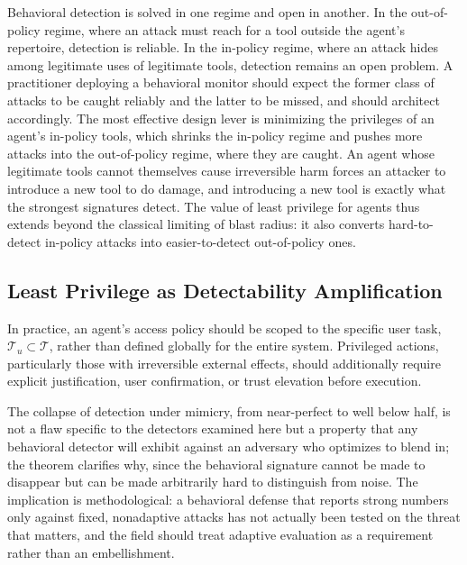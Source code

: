 \documentclass[journal]{IEEEtran}
\theoremstyle{remark}
\begin{document}
Behavioral detection is solved in one regime and open in another. In the out-of-policy regime, where an attack must reach for a tool outside the agent's repertoire, detection is reliable. In the in-policy regime, where an attack hides among legitimate uses of legitimate tools, detection remains an open problem. A practitioner deploying a behavioral monitor should expect the former class of attacks to be caught reliably and the latter to be missed, and should architect accordingly. The most effective design lever is minimizing the privileges of an agent's in-policy tools, which shrinks the in-policy regime and pushes more attacks into the out-of-policy regime, where they are caught. An agent whose legitimate tools cannot themselves cause irreversible harm forces an attacker to introduce a new tool to do damage, and introducing a new tool is exactly what the strongest signatures detect. The value of least privilege for agents thus extends beyond the classical limiting of blast radius: it also converts hard-to-detect in-policy attacks into easier-to-detect out-of-policy ones.

\subsection{Least Privilege as Detectability Amplification}
In practice, an agent's access policy should be scoped to the specific user task, $\mathcal{T}_u\subset\mathcal{T}$, rather than defined globally for the entire system. Privileged actions, particularly those with irreversible external effects, should additionally require explicit justification, user confirmation, or trust elevation before execution.

The collapse of detection under mimicry, from near-perfect to well below half, is not a flaw specific to the detectors examined here but a property that any behavioral detector will exhibit against an adversary who optimizes to blend in; the theorem clarifies why, since the behavioral signature cannot be made to disappear but can be made arbitrarily hard to distinguish from noise. The implication is methodological: a behavioral defense that reports strong numbers only against fixed, nonadaptive attacks has not actually been tested on the threat that matters, and the field should treat adaptive evaluation as a requirement rather than an embellishment.
\end{document}
